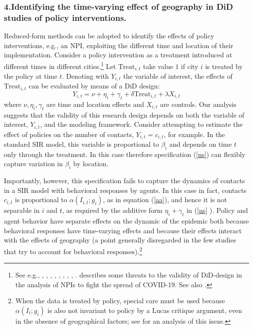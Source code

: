 \documentclass[english,11pt]{article}
\begin{document}
\subsubsection*{4.\hspace{1ex}Identifying the time-varying effect of geography in DiD studies of policy interventions.} \label{didstudies} Reduced-form methods can be adopted to identify the effects of policy interventions, e.g., an NPI, exploiting the different time and location of their implementation. Consider a policy intervention as a treatment introduced at different times in different cities.\footnote{See e.g.,   
\cite{allcott2020polarization},
\cite{Chernozhukov2020},
\cite{couture},
\cite{courtemanche2020did}, 
\cite{fang2020human},
\cite{gupta2020effects}
\cite{hsiang2020effect}
\cite{maloney2020determinants},  \cite{mangrum2020college}, \cite{pepe2020covid},
\cite{yilmazkuday2020covid}.  \cite{bacon2020} describes some threats to the validity of
DiD-design in the analysis of NPIs to fight
the spread of COVID-19. See also \cite{CALLAWAY2020}.} 
Let  $\text{Treat}_{i,t}$ take value $1$ if city $i$ is treated by the policy at time $t$. 
Denoting with $Y_{i,t}$ the variable of interest, 
the effects of  $\text{Treat}_{i,t}$ can be evaluated by means of  a DiD design: 
\begin{equation} 
    Y_{i,t}= \nu + \eta_{i}   + \gamma_t +  \delta \text{Treat}_{i,t} +\lambda X_{i,t} \label{ns} 
\end{equation} 
where   $ \nu, \eta_i, \gamma_t$ are time and location effects and $X_{i,t}$ are  controls.
Our analysis suggests that the validity of this research design depends on both the variable of interest, $Y_{i,t}$, and the modeling framework. Consider attempting to estimate the effect of policies on the number of contacts, $Y_{i,t}=c_{i,t}$, for example. In the standard SIR model, this variable is proportional to $\beta_{i}$ and depends on time $t$ only through the treatment. In this case therefore specification (\ref{ns}) can flexibly capture variation in $\beta_i$ by location. 

Importantly, however, this specification fails to capture the dynamics of contacts in a SIR model with behavioral responses by agents. In this case in fact, contacts $c_{i,t}$ is proportional to $\alpha(I_{i,t}; g_i)$, as in equation (\ref{aa}), and hence it is not separable in $i$ and $t$, as required by the additive
form $\eta_i+\gamma_t$ in (\ref{ns} ). Policy and agent behavior have separate effects on the dynamic of the epidemic both because behavioral responses have
time-varying effects and because their effects 
interact with 
the effects of geography (a point
generally disregarded in the few studies that try to account for behavioral responses).\footnote{When the data is treated by policy, special care must be used because 
$\alpha (I_t;g_i)$ is also not invariant to policy by a Lucas critique argument, even in the absence of geographical factors; see \cite{bisinmoro2020} for an analysis of this issue.} 
\end{document}
